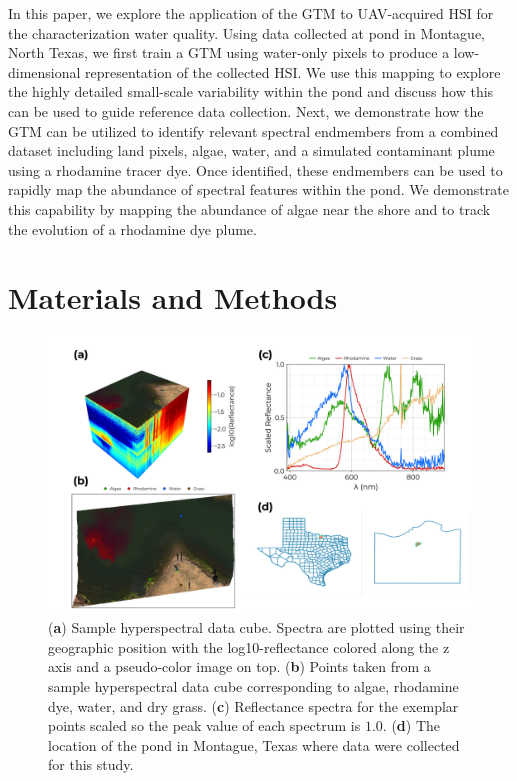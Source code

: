 \documentclass[remotesensing,article,submit,pdftex,moreauthors]{Definitions/mdpi}
\begin{document}
In this paper, we explore the application of the GTM to UAV-acquired HSI for the characterization water quality. Using data collected at pond in Montague, North Texas, we first train a GTM using water-only pixels to produce a low-dimensional representation of the collected HSI. We use this mapping to explore the highly detailed small-scale variability within the pond and discuss how this can be used to guide reference data collection. Next, we demonstrate how the GTM can be utilized to identify relevant spectral endmembers from a combined dataset including land pixels, algae, water, and a simulated contaminant plume using a rhodamine tracer dye. Once identified, these endmembers can be used to rapidly map the abundance of spectral features within the pond. We demonstrate this capability by mapping the abundance of algae near the shore and to track the evolution of a rhodamine dye plume. 



\section{Materials and Methods}


\begin{figure}[t]
\centering
\includegraphics[width=\columnwidth]{paper/figures/methods/sample-spectra.pdf}
\caption{(\textbf{a}) Sample hyperspectral data cube. Spectra are plotted using their geographic position with the log10-reflectance colored along the z axis and a pseudo-color image on top. (\textbf{b}) Points taken from a sample hyperspectral data cube corresponding to algae, rhodamine dye, water, and dry grass. (\textbf{c}) Reflectance spectra for the exemplar points scaled so the peak value of each spectrum is $1.0$. (\textbf{d}) The location of the pond in Montague, Texas where data were collected for this study.\label{fig:sample-spectra}}
\end{figure}  
\end{document}
